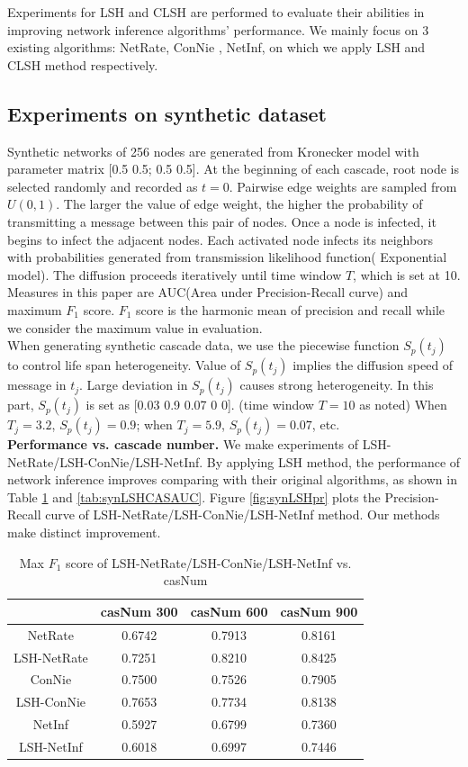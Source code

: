 Experiments for LSH and CLSH are performed to evaluate their abilities in improving network inference algorithms' performance. We mainly focus on 3 existing algorithms: NetRate, ConNie , NetInf, on which we apply LSH and CLSH method respectively. 
\subsection{Experiments on synthetic dataset}
Synthetic networks of 256 nodes are generated from Kronecker model with parameter matrix [0.5 0.5; 0.5 0.5]. At the beginning of each cascade, root node is selected randomly and recorded as $t=0$. Pairwise edge weights are sampled from $U(0,1)$. The larger the value of edge weight, the higher the probability of transmitting a message between this pair of nodes.  Once a node is infected, it begins to infect the adjacent nodes. Each activated node infects its neighbors with probabilities generated from transmission likelihood function( Exponential model). The diffusion proceeds iteratively until time window $T$, which is set at 10.
\\ Measures in this paper are AUC(Area under Precision-Recall curve) and maximum $F_1$ score. $F_1$ score is the harmonic mean of precision and recall while we consider the maximum value in evaluation.
\\ When generating synthetic cascade data, we use the piecewise function $S_p(t_j)$ to control life span heterogeneity. Value of $S_p(t_j)$ implies the diffusion speed of message in $t_j$. Large deviation in $S_p(t_j)$ causes strong heterogeneity. In this part, $S_p(t_j)$ is set as [0.03 0.9 0.07 0 0]. (time window $T=10$ as noted) When $T_j=3.2$, $S_p(t_j)=0.9$; when $T_j=5.9$, $S_p(t_j)=0.07$, etc.
\\\textbf{Performance vs. cascade number.} We make experiments of LSH-NetRate/LSH-ConNie/LSH-NetInf. By applying LSH method, the performance of network inference improves comparing with their original algorithms, as shown in Table \ref{tab:synLSHCASf1} and \ref{tab:synLSHCASAUC}. Figure \ref{fig:synLSHpr} plots the Precision-Recall curve of LSH-NetRate/LSH-ConNie/LSH-NetInf method. Our methods make distinct improvement.
\begin{table}[H]
\caption{Max $F_1$ score of LSH-NetRate/LSH-ConNie/LSH-NetInf vs. casNum}
\begin{tabular}{c|c|c|c}
 & casNum 300 & casNum 600 & casNum 900 \\
\hline
NetRate & 0.6742 & 0.7913 & 0.8161\\
LSH-NetRate & 0.7251 & 0.8210 & 0.8425\\
\hline
ConNie & 0.7500 & 0.7526 & 0.7905\\
LSH-ConNie & 0.7653 & 0.7734 & 0.8138\\
\hline
NetInf & 0.5927 & 0.6799 & 0.7360\\
LSH-NetInf & 0.6018 & 0.6997 & 0.7446
\end{tabular}\label{tab:synLSHCASf1}
\end{table}
